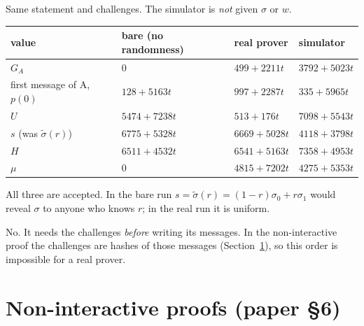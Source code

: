 \documentclass[11pt,a4paper]{article}
\newcommand{\mle}[1]{\widetilde{#1}}
\theoremstyle{definition}
\theoremstyle{plain}
\begin{document}
\begin{toyrun}
Same statement and challenges. The simulator is \emph{not} given $\sigma$ or $w$.
\begin{center}\small
\begin{tabular}{@{}llll@{}}
\toprule
value & bare (no randomness) & real prover & simulator\\\midrule
$G_A$ & $0$ & $499{+}2211t$ & $3792{+}5023t$\\
first message of A, $p(0)$ & $128{+}5163t$ & $997{+}2287t$ & $335{+}5965t$\\
$U$ & $5474{+}7238t$ & $513{+}176t$ & $7098{+}5543t$\\
$s$ (was $\mle\sigma(r)$) & $6775{+}5328t$ & $6669{+}5028t$ & $4118{+}3798t$\\
$H$ & $6511{+}4532t$ & $6541{+}5163t$ & $7358{+}4953t$\\
$\mu$ & $0$ & $4815{+}7202t$ & $4275{+}5353t$\\
\bottomrule
\end{tabular}
\end{center}
All three are accepted. In the bare run $s=\mle\sigma(r)=(1-r)\sigma_0+r\sigma_1$ would reveal $\sigma$ to anyone
who knows $r$; in the real run it is uniform.
\end{toyrun}

\begin{why}
No. It needs the challenges \emph{before} writing its messages. In the non-interactive proof the challenges are
hashes of those messages (Section~\ref{sec:fs}), so this order is impossible for a real prover.
\end{why}

\section{Non-interactive proofs (paper \S6)}
\label{sec:fs}
\end{document}
